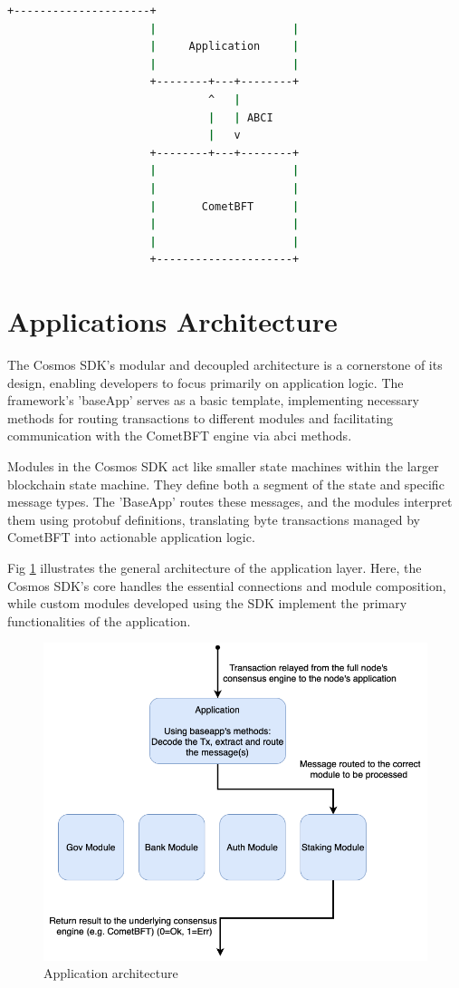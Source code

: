 \newpage
\begin{lstlisting}[language=bash, caption=ABCI Interface. Source:\cite{app-based-blockchain},label={lst:ABCI}]
                      +---------------------+
                      |                     |
                      |     Application     |
                      |                     |
                      +--------+---+--------+
                               ^   |
                               |   | ABCI
                               |   v
                      +--------+---+--------+
                      |                     |
                      |                     |
                      |       CometBFT      |
                      |                     |
                      |                     |
                      +---------------------+
\end{lstlisting}

\section{Applications Architecture}
\label{ch:applicatoins-architecture}

The Cosmos SDK's modular and decoupled architecture is a cornerstone of its design, enabling developers to focus primarily on application logic. The framework's 'baseApp' serves as a basic template, implementing necessary methods for routing transactions to different modules and facilitating communication with the CometBFT engine via \gls{abci} methods.

Modules in the Cosmos SDK act like smaller state machines within the larger blockchain state machine. They define both a segment of the state and specific message types. The 'BaseApp' routes these messages, and the modules interpret them using protobuf definitions, translating byte transactions managed by CometBFT into actionable application logic.

Fig \ref{fig:application-modules} illustrates the general architecture of the application layer. Here, the Cosmos SDK's core handles the essential connections and module composition, while custom modules developed using the SDK implement the primary functionalities of the application.

\begin{figure}[H]
    \centering
    \includegraphics[width=\textwidth]{figures/prueba.png}
    \caption{Application architecture}
    \label{fig:application-modules}
\end{figure}
